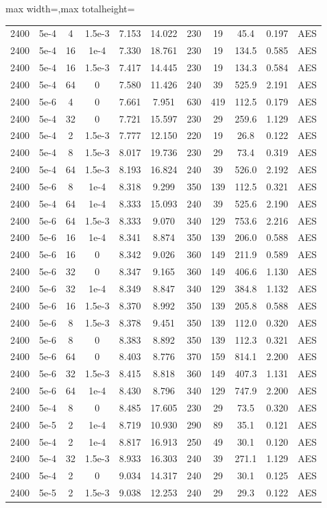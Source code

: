 \begin{table}[p]
\begin{adjustbox}{max width=\textwidth,max totalheight=\textheight}
\begin{tabular}{ccccccccccc}
2400&5e-4&4&1.5e-3&7.153&14.022&230&19&45.4&0.197&AES\\
2400&5e-4&16&1e-4&7.330&18.761&230&19&134.5&0.585&AES\\
2400&5e-4&16&1.5e-3&7.417&14.445&230&19&134.3&0.584&AES\\
2400&5e-4&64&0&7.580&11.426&240&39&525.9&2.191&AES\\
2400&5e-6&4&0&7.661&7.951&630&419&112.5&0.179&AES\\
2400&5e-4&32&0&7.721&15.597&230&29&259.6&1.129&AES\\
2400&5e-4&2&1.5e-3&7.777&12.150&220&19&26.8&0.122&AES\\
2400&5e-4&8&1.5e-3&8.017&19.736&230&29&73.4&0.319&AES\\
2400&5e-4&64&1.5e-3&8.193&16.824&240&39&526.0&2.192&AES\\
2400&5e-6&8&1e-4&8.318&9.299&350&139&112.5&0.321&AES\\
2400&5e-4&64&1e-4&8.333&15.093&240&39&525.6&2.190&AES\\
2400&5e-6&64&1.5e-3&8.333&9.070&340&129&753.6&2.216&AES\\
2400&5e-6&16&1e-4&8.341&8.874&350&139&206.0&0.588&AES\\
2400&5e-6&16&0&8.342&9.026&360&149&211.9&0.589&AES\\
2400&5e-6&32&0&8.347&9.165&360&149&406.6&1.130&AES\\
2400&5e-6&32&1e-4&8.349&8.847&340&129&384.8&1.132&AES\\
2400&5e-6&16&1.5e-3&8.370&8.992&350&139&205.8&0.588&AES\\
2400&5e-6&8&1.5e-3&8.378&9.451&350&139&112.0&0.320&AES\\
2400&5e-6&8&0&8.383&8.892&350&139&112.3&0.321&AES\\
2400&5e-6&64&0&8.403&8.776&370&159&814.1&2.200&AES\\
2400&5e-6&32&1.5e-3&8.415&8.818&360&149&407.3&1.131&AES\\
2400&5e-6&64&1e-4&8.430&8.796&340&129&747.9&2.200&AES\\
2400&5e-4&8&0&8.485&17.605&230&29&73.5&0.320&AES\\
2400&5e-5&2&1e-4&8.719&10.930&290&89&35.1&0.121&AES\\
2400&5e-4&2&1e-4&8.817&16.913&250&49&30.1&0.120&AES\\
2400&5e-4&32&1.5e-3&8.933&16.303&240&39&271.1&1.129&AES\\
2400&5e-4&2&0&9.034&14.317&240&29&30.1&0.125&AES\\
2400&5e-5&2&1.5e-3&9.038&12.253&240&29&29.3&0.122&AES\\

\end{tabular}
\end{adjustbox}
\end{table}
